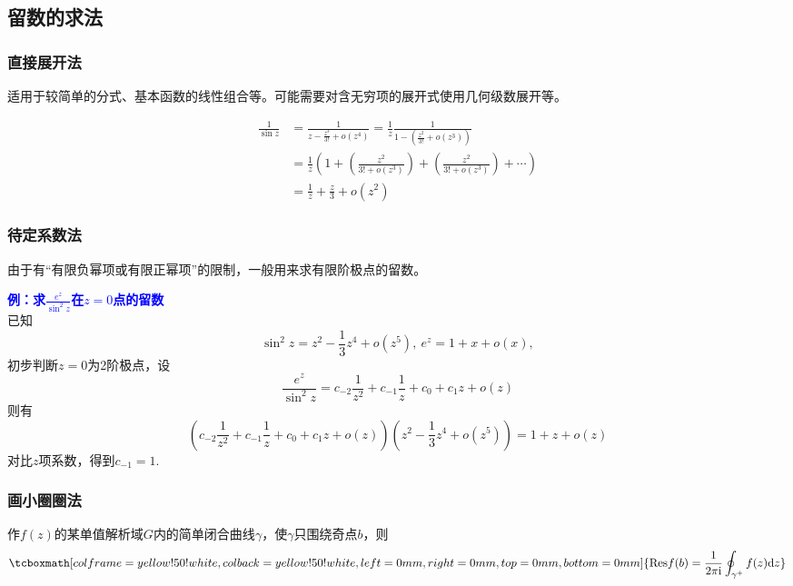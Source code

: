 \documentclass[UTF8,12pt]{ctexart}
\newcommand\stress{\tcboxmath[colframe=yellow!50!white,colback=yellow!50!white,left=0mm,right=0mm,top=0mm,bottom=0mm]}
\newcommand{\I}{{\rm i}}
\begin{document}
\newpage
\subsection{留数的求法}
\subsubsection{直接展开法}
适用于较简单的分式、基本函数的线性组合等。可能需要对含无穷项的展开式使用几何级数展开等。
\begin{ebox}
    \begin{equation}\begin{aligned}
        \frac{1}{\sin z}&=\frac{1}{z-\frac{z^3}{3!}+o(z^4)}=\frac{1}{z}\frac{1}{1-\left(\frac{z^2}{3!}+o(z^3)\right)}\\
        &=\frac{1}{z}\left(1+\left(\frac{z^2}{3!+o(z^3)}\right)+\left(\frac{z^2}{3!+o(z^3)}\right)+\cdots\right)\\
        &=\frac{1}{z}+\frac{z}{3}+o(z^2)
    \end{aligned}\end{equation}
\end{ebox}

\subsubsection{待定系数法}
由于有“有限负幂项或有限正幂项”的限制，一般用来求有限阶极点的留数。
\begin{ebox}
    \textcolor{blue}
    {\bf 例：求$\frac{e^z}{\sin^2z}$在$z=0$点的留数\vspace{1em}\\}
    已知
    \begin{equation}
        \sin^2z=z^2-\frac{1}{3}z^4+o(z^5),\ e^z=1+x+o(x),
    \end{equation}
    初步判断$z=0$为2阶极点，设
    \begin{equation}
        \frac{e^z}{\sin^2z}=c_{-2}\frac{1}{z^2}+c_{-1}\frac{1}{z}+c_0+c_1z+o(z)
    \end{equation}
    则有
    \begin{equation}\left(c_{-2}\frac{1}{z^2}+c_{-1}\frac{1}{z}+c_0+c_1z+o(z)\right)\left(z^2-\frac{1}{3}z^4+o(z^5)\right)=1+z+o(z)
    \end{equation}
    对比$z$项系数，得到$c_{-1}=1.$
\end{ebox}

\subsubsection{画小圈圈法}
作$f(z)$的某单值解析域$G$内的简单闭合曲线$\gamma$，使$\gamma$只围绕奇点$b$，则
\begin{equation}
    \stress{{\rm Res}f(b)=\frac{1}{2\pi\I}\oint_{\gamma^+} f(z){\rm d}z}
\end{equation}
\end{document}
